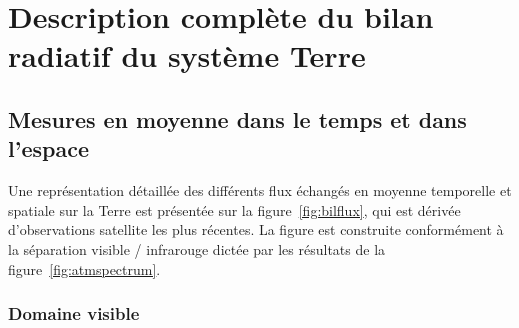 		


\mk
\section{Description complète du bilan radiatif du système Terre}

\sk
\subsection{Mesures en moyenne dans le temps et dans l'espace}

\sk
Une représentation détaillée des différents flux échangés en moyenne temporelle et spatiale sur la Terre est présentée sur la figure~\ref{fig:bilflux}, qui est dérivée d'observations satellite les plus récentes. La figure est construite conformément à la séparation visible / infrarouge dictée par les résultats de la figure~\ref{fig:atmspectrum}. 

\sk
\subsubsection{Domaine visible}

